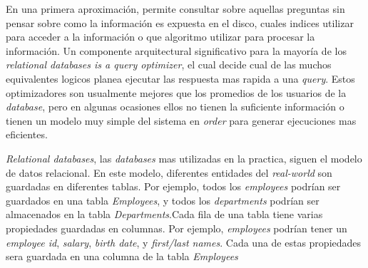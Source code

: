En una primera aproximación,  permite consultar sobre aquellas preguntas sin pensar sobre como la información es expuesta en el disco, cuales indices utilizar para acceder a la información o que algoritmo utilizar para procesar la información. Un componente arquitectural significativo para la mayoría de los \textit{relational databases is a query optimizer}, el cual decide cual de las muchos equivalentes logicos planea ejecutar las respuesta mas rapida a una \textit{query}. Estos optimizadores son usualmente mejores que los promedios de los usuarios de la \textit{database}, pero en algunas ocasiones ellos no tienen la suficiente información o tienen un modelo muy simple del sistema en \textit{order} para generar ejecuciones mas eficientes.

\textit{Relational databases}, las \textit{databases} mas utilizadas en la practica, siguen el modelo de datos relacional. En este modelo, diferentes entidades del \textit{real-world} son guardadas en diferentes tablas. Por ejemplo, todos los \textit{employees} podrían ser guardados en una tabla \textit{Employees}, y todos los \textit{departments} podrían ser almacenados en la tabla \textit{Departments}.Cada fila de una tabla tiene varias propiedades guardadas en columnas. Por ejemplo, \textit{employees} podrían tener un \textit{employee id}, \textit{salary}, \textit{birth date}, y \textit{first/last names}. Cada una de estas propiedades sera guardada en una columna de la tabla \textit{Employees}


